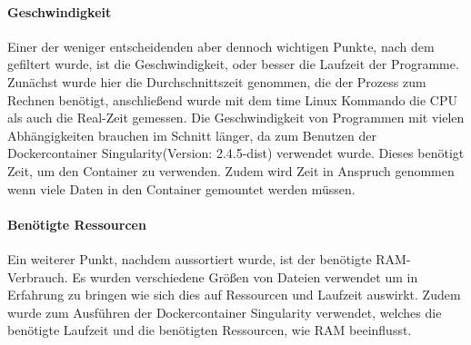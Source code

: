 \documentclass{scrartcl}
\begin{document}
\paragraph{Geschwindigkeit}
\label{sec-3-2-2-3}
Einer der weniger entscheidenden aber dennoch wichtigen Punkte, nach dem gefiltert wurde, ist die Geschwindigkeit, 
oder besser die Laufzeit der Programme. Zunächst wurde hier die Durchschnittszeit genommen, die der Prozess zum Rechnen benötigt,
anschließend wurde mit dem time Linux Kommando die CPU als auch die Real-Zeit gemessen. Die Geschwindigkeit von Programmen mit vielen Abhängigkeiten 
brauchen im Schnitt länger, da zum Benutzen der Dockercontainer Singularity\footnotemark[18]{}(Version: 2.4.5-dist) verwendet wurde. Dieses benötigt Zeit, um den Container zu verwenden.
Zudem wird Zeit in Anspruch genommen wenn viele Daten in den Container gemountet werden müssen.
\paragraph{Benötigte Ressourcen}
\label{sec-3-2-2-4}
Ein weiterer Punkt, nachdem aussortiert wurde, ist der benötigte RAM-Verbrauch. Es wurden verschiedene Größen von Dateien verwendet
um in Erfahrung zu bringen wie sich dies auf Ressourcen und Laufzeit auswirkt. Zudem wurde zum Ausführen der Dockercontainer 
Singularity \footnotemark[18]{} verwendet, welches die benötigte Laufzeit und die benötigten Ressourcen, wie RAM beeinflusst. 
\end{document}

